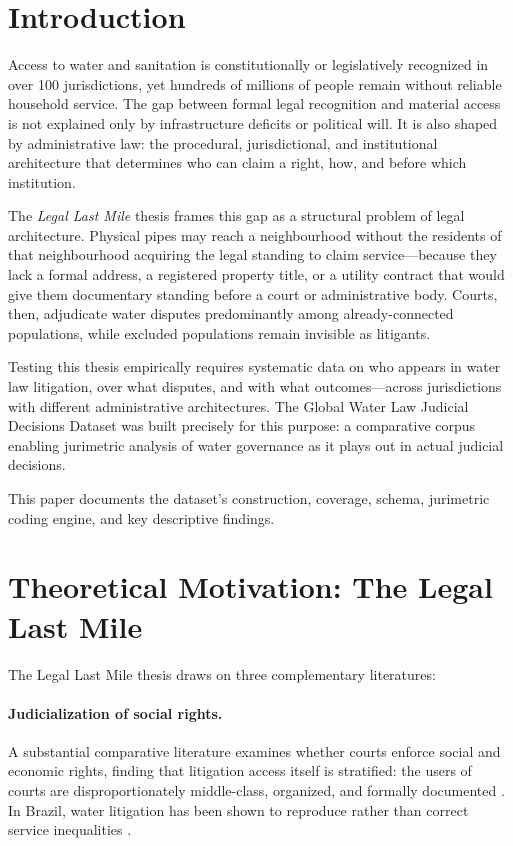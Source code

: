 \documentclass[12pt]{article}
\begin{document}
\section{Introduction}

Access to water and sanitation is constitutionally or legislatively recognized in over 100 jurisdictions, yet hundreds of millions of people remain without reliable household service. The gap between formal legal recognition and material access is not explained only by infrastructure deficits or political will. It is also shaped by administrative law: the procedural, jurisdictional, and institutional architecture that determines who can claim a right, how, and before which institution.

The \emph{Legal Last Mile} thesis frames this gap as a structural problem of legal architecture. Physical pipes may reach a neighbourhood without the residents of that neighbourhood acquiring the legal standing to claim service—because they lack a formal address, a registered property title, or a utility contract that would give them documentary standing before a court or administrative body. Courts, then, adjudicate water disputes predominantly among already-connected populations, while excluded populations remain invisible as litigants.

Testing this thesis empirically requires systematic data on who appears in water law litigation, over what disputes, and with what outcomes—across jurisdictions with different administrative architectures. The Global Water Law Judicial Decisions Dataset was built precisely for this purpose: a comparative corpus enabling jurimetric analysis of water governance as it plays out in actual judicial decisions.

This paper documents the dataset's construction, coverage, schema, jurimetric coding engine, and key descriptive findings.

\section{Theoretical Motivation: The Legal Last Mile}

The Legal Last Mile thesis draws on three complementary literatures:

\paragraph{Judicialization of social rights.} A substantial comparative literature examines whether courts enforce social and economic rights, finding that litigation access itself is stratified: the users of courts are disproportionately middle-class, organized, and formally documented \citep{gauri2008,hirschl2004}. In Brazil, water litigation has been shown to reproduce rather than correct service inequalities \citep{haglund2014,haglund2019}.
\end{document}
